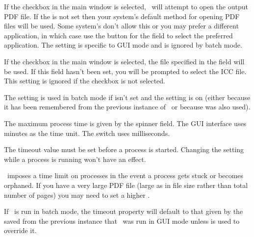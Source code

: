 If the  checkbox in the main window is selected, 
\Jmakepdfx\ will attempt to open the output PDF file.
If the  is not set then 
your system's default method for opening PDF files will be used.
Some system's don't allow this or you may prefer a different
application, in which case use the  button for the
 field to select the preferred
application. The  setting is
specific to \gls{GUI} mode and is ignored by batch mode.

If the  checkbox in the main window is
selected, the file specified in the 
field will be used. If this field hasn't been set, you will be
prompted to select the \gls{ICC} file. This setting is ignored
if the  checkbox is not selected.

\begin{information}
The  setting is used in batch mode if
 isn't set and the 
setting is on (either because it has been remembered from the
previous instance of \Jmakepdfx\ or because  was also
used).
\end{information}

The maximum process time is given by the 
spinner field. The \gls{GUI} interface uses minutes as the time
unit. The  switch uses milliseconds.

\begin{important}
The timeout value must be set before a process is started. Changing
the setting while a process is running won't have an effect.
\end{important}

\Jmakepdfx\ imposes a time limit on processes in the event a process
gets stuck or becomes orphaned. If you have a very large PDF file
(large as in file size rather than total number of pages) you may
need to set a higher .


\begin{information}
If \Jmakepdfx\ is run in batch mode, the timeout property will
default to that given by the saved 
from the previous instance that \Jmakepdfx\ was run in \gls{GUI}
mode unless  is used to override it.
\end{information}


